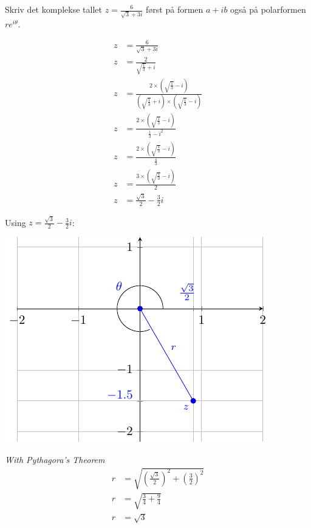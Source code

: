 \documentclass{myassignment}
\begin{document}
	\begin{problem}
		Skriv det komplekse tallet $z=\frac{6}{\sqrt{3}+3i}$ først på formen $a+ib$ også på polarformen $re^{i\theta}$.
	\end{problem}

		\begin{multicols}{2}
			\begin{answer}
				\begin{align*}
					z &= \frac{6}{\sqrt{3}+3i} \\[0.4em]
					z &= \frac{2}{\sqrt{\frac{1}{3}}+i} \\[0.4em]
					z &= \frac{2\times(\sqrt{\frac{1}{3}}-i)}{(\sqrt{\frac{1}{3}}+i)\times(\sqrt{\frac{1}{3}}-i)} \\[0.4em]
					z &= \frac{2\times(\sqrt{\frac{1}{3}}-i)}{\frac{1}{3}-i^2} \\[0.4em]
					z &= \frac{2\times(\sqrt{\frac{1}{3}}-i)}{\frac{4}{3}} \\[0.4em]
					z &= \frac{3\times(\sqrt{\frac{1}{3}}-i)}{2} \\[0.4em]
					z &= \frac{\sqrt{3}}{2} - \frac{3}{2}i
				\end{align*}
				\vspace*{\fill}
			\end{answer}

				\vspace*{2em}
				\begin{center}
				Using $z = \frac{\sqrt{3}}{2} - \frac{3}{2}i$:

				\includegraphics[scale=1]{graphact1.pdf}
				\end{center}
			\columnbreak

			\begin{answer}
				\textit{\hspace*{2em}\small With Pythagora's Theorem}
				\begin{align*}
					r &= \sqrt{(\frac{\sqrt{3}}{2})^2 +(\frac{3}{2})^2}\\
					r &= \sqrt{\frac{3}{4} + \frac{9}{4}} \\
					r &= \sqrt{3}
				\end{align*}
				\blackqed
				\vspace*{-1em}


\end{answer}
\end{multicols}
\end{document}
